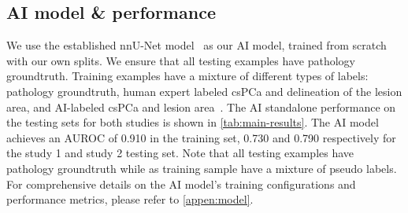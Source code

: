 \subsection{AI model \& performance}

We use the established nnU-Net model~\cite{isensee2021nnu,bosma2021annotation} as our AI model, trained from scratch with our own splits.  
We ensure that all testing examples have pathology groundtruth. 
Training examples have a mixture of different types of labels: pathology groundtruth, human expert labeled csPCa and delineation of the lesion area, and AI-labeled csPCa and lesion area~\cite{SahaBosmaTwilt2024}.
The AI standalone performance on the testing sets for both studies is shown in \cref{tab:main-results}.
The AI model achieves an AUROC of 0.910 in the training set, 0.730 and 0.790 respectively for the study 1 and study 2 testing set. 
Note that all testing examples have pathology groundtruth while as training sample have a mixture of pseudo labels.
For comprehensive details on the AI model's training configurations and performance metrics, please refer to \cref{appen:model}.%




